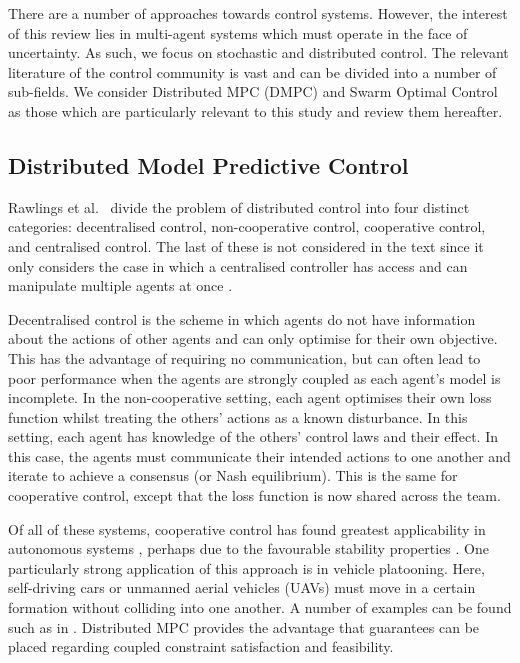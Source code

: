 \documentclass[.../main.tex]{subfiles}
\begin{document}
There are a number of approaches towards control systems. However, the
interest of this review lies in multi-agent systems which must operate
in the face of uncertainty. As such, we focus on stochastic and
distributed control. The relevant literature of the control community
is vast and can be divided into a number of sub-fields. We consider
Distributed MPC (DMPC) and Swarm Optimal Control as those which are
particularly relevant to this study and review them hereafter.

\subsection{Distributed Model Predictive Control} \label{sec::Distributed_MPC}

Rawlings et al.~\cite{rawlings2017model} divide the problem of
distributed control into four distinct categories: decentralised
control, non-cooperative control, cooperative control, and centralised
control. The last of these is not considered in the text since it only
considers the case in which a centralised controller has access and
can manipulate multiple agents at once .

Decentralised control is the scheme in which agents do not have
information about the actions of other agents and can only optimise
for their own objective. This has the advantage of requiring no
communication, but can often lead to poor performance when the agents
are strongly coupled as each agent’s model is incomplete. In the
non-cooperative setting, each agent optimises their own loss function
whilst treating the others’ actions as a known disturbance. In this
setting, each agent has knowledge of the others’ control laws and
their effect. In this case, the agents must communicate their intended
actions to one another and iterate to achieve a consensus (or Nash
equilibrium). This is the same for cooperative control, except that
the loss function is now shared across the team.

Of all of these systems, cooperative control has found greatest
applicability in autonomous systems \cite{Negenborn2014}, perhaps due
to the favourable stability properties \cite{Venkat2006}. One
particularly strong application of this approach is in vehicle
platooning. Here, self-driving cars or unmanned aerial vehicles (UAVs)
must move in a certain formation without colliding into one another.
A number of examples can be found such as in \cite{Liu2019,
  VanParys2017, Zheng2017}. Distributed MPC provides the advantage
that guarantees can be placed regarding coupled constraint
satisfaction and feasibility.
\end{document}
